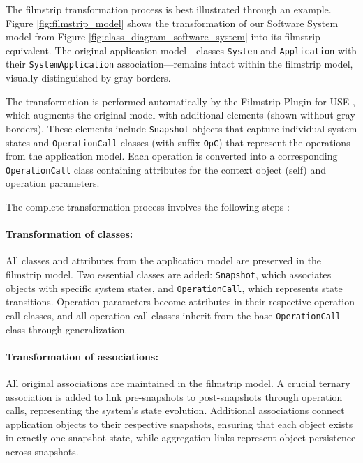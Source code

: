 The filmstrip transformation process is best illustrated through an example. 
Figure \ref{fig:filmstrip_model} shows the transformation of our Software System 
model from Figure \ref{fig:class_diagram_software_system} into its filmstrip 
equivalent. The original application model—classes \texttt{System} and 
\texttt{Application} with their \texttt{SystemApplication} association—remains 
intact within the filmstrip model, visually distinguished by gray borders.

The transformation is performed automatically by the Filmstrip Plugin for USE \cite{Filmstripping}, which 
augments the original model with additional elements (shown without gray borders). 
These elements include \texttt{Snapshot} objects that capture individual system 
states and \texttt{OperationCall} classes (with suffix \texttt{OpC}) that represent 
the operations from the application model. Each operation is converted into a 
corresponding \texttt{OperationCall} class containing attributes for the context 
object (self) and operation parameters.

The complete transformation process involves the following steps \cite{Filmstripping}:
\vspace{-1.2em}
\paragraph{Transformation of classes:} All classes and attributes from the 
application model are preserved in the filmstrip model. Two essential classes are 
added: \texttt{Snapshot}, which associates objects with specific system states, 
and \texttt{OperationCall}, which represents state transitions. Operation parameters 
become attributes in their respective operation call classes, and all operation call 
classes inherit from the base \texttt{OperationCall} class through generalization.
\vspace{-1.2em}
\paragraph{Transformation of associations:} All original associations are maintained 
in the filmstrip model. A crucial ternary association is added to link pre-snapshots 
to post-snapshots through operation calls, representing the system's state evolution. 
Additional associations connect application objects to their respective snapshots, 
ensuring that each object exists in exactly one snapshot state, while aggregation 
links represent object persistence across snapshots.
\vspace{-1.2em}
